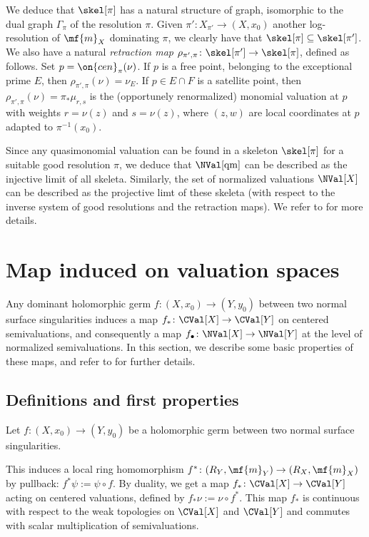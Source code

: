\documentclass[11 pt, twoside, a4paper]{amsart}
\newcommand{\dgraph}[1]{\varGamma_{#1}}
\newcommand{\cen}{\on{cen}}
\theoremstyle{definition}
\theoremstyle{definition}
\begin{document}
We deduce that $\skel[\pi]$ has a natural structure of graph, isomorphic to the dual graph $\dgraph{\pi}$ of the resolution $\pi$.
Given $\pi' \colon X_{\pi'} \to (X,x_0)$ another log-resolution of $\mf{m}_X$ dominating $\pi$, we clearly have that $\skel[\pi] \subseteq \skel[\pi']$.
We also have a natural \emph{retraction map} $\rho_{\pi',\pi} \colon \skel[\pi'] \to \skel[\pi]$, defined as follows.
Set $p=\cen_\pi(\nu)$. If $p$ is a free point, belonging to the exceptional prime $E$, then $\rho_{\pi',\pi}(\nu)=\nu_E$.
If $p \in E \cap F$ is a satellite point, then $\rho_{\pi',\pi}(\nu)=\pi_* \mu_{r,s}$ is the (opportunely renormalized) monomial valuation at $p$ with weights $r=\nu(z)$ and $s=\nu(z)$, where $(z,w)$ are local coordinates at $p$ adapted to $\pi^{-1}(x_0)$.

Since any quasimonomial valuation can be found in a skeleton $\skel[\pi]$ for a suitable good resolution $\pi$, we deduce that $\NVal[\mathrm{qm}]$ can be described as the injective limit of all skeleta.
Similarly, the set of normalized valuations $\NVal[X]$ can be described as the projective limt of these skeleta (with respect to the inverse system of good resolutions and the retraction maps).
We refer to \cite{thuillier:homotopy, jonsson:berkovich} for more details.




\section{Map induced on valuation spaces}\label{sec:valmap}

Any dominant holomorphic germ $f \colon (X,x_0) \to (Y,y_0)$ between two normal surface singularities induces a map $f_* \colon \CVal[X] \to \CVal[Y]$ on centered semivaluations, and consequently a map $f_\bullet \colon \NVal[X] \to \NVal[Y]$ at the level of normalized semivaluations.
In this section, we describe some basic properties of these maps, and refer to \cite{favre-jonsson:eigenval, favre:holoselfmapssingratsurf, gignac-ruggiero:locdynnoninvnormsurfsing} for further details.

\subsection{Definitions and first properties}

Let $f \colon (X,x_0) \to (Y,y_0)$ be a holomorphic germ between two normal surface singularities.

This induces a local ring homomorphism $f^*\colon (R_Y,\mf{m}_Y) \to (R_X, \mf{m}_X)$ by pullback: $f^* \psi := \psi \circ f$.
By duality, we get a map $f_*\colon \CVal[X] \to \CVal[Y]$ acting on centered valuations, defined by $f_*\nu := \nu\circ f^*$. This map $f_*$ is continuous with respect to the weak topologies on $\CVal[X]$ and $\CVal[Y]$ and commutes with scalar multiplication of semivaluations.
\end{document}
